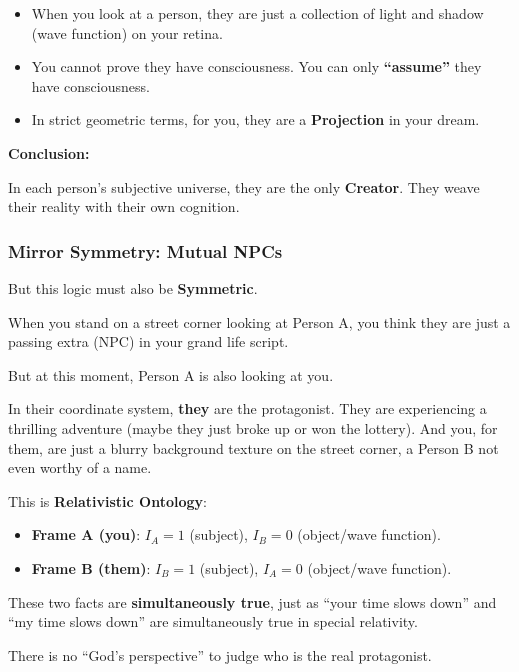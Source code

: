 \begin{itemize}
\item When you look at a person, they are just a collection of light and shadow (wave function) on your retina.

\item You cannot prove they have consciousness. You can only \textbf{``assume''} they have consciousness.

\item In strict geometric terms, for you, they are a \textbf{Projection} in your dream.
\end{itemize}

\textbf{Conclusion:}

In each person's subjective universe, they are the only \textbf{Creator}. They weave their reality with their own cognition.

\subsubsection{Mirror Symmetry: Mutual NPCs}

But this logic must also be \textbf{Symmetric}.

When you stand on a street corner looking at Person A, you think they are just a passing extra (NPC) in your grand life script.

But at this moment, Person A is also looking at you.

In their coordinate system, \textbf{they} are the protagonist. They are experiencing a thrilling adventure (maybe they just broke up or won the lottery). And you, for them, are just a blurry background texture on the street corner, a Person B not even worthy of a name.

This is \textbf{Relativistic Ontology}:

\begin{itemize}
\item \textbf{Frame A (you)}: $I_A = 1$ (subject), $I_B = 0$ (object/wave function).

\item \textbf{Frame B (them)}: $I_B = 1$ (subject), $I_A = 0$ (object/wave function).
\end{itemize}

These two facts are \textbf{simultaneously true}, just as ``your time slows down'' and ``my time slows down'' are simultaneously true in special relativity.

There is no ``God's perspective'' to judge who is the real protagonist.

